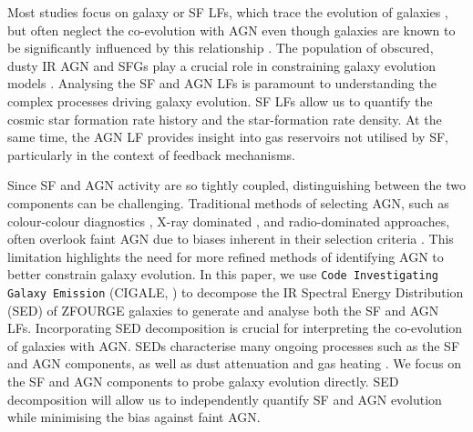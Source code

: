 Most studies focus on galaxy or SF LFs, which trace the evolution of galaxies \citep{tempel_tracing_2011, cool_galaxy_2012}, but often neglect the co-evolution with AGN \citep{fotopoulou_5-10_2016, symeonidis_agn_2021, finkelstein_coevolution_2022} even though galaxies are known to be significantly influenced by this relationship \citep{hopkins_cosmological_2008, fiore_agn_2017}. The population of obscured, dusty IR AGN and SFGs play a crucial role in constraining galaxy evolution models \citep{gruppioni_modelling_2011}. Analysing the SF and AGN LFs is paramount to understanding the complex processes driving galaxy evolution. SF LFs allow us to quantify the cosmic star formation rate history and the star-formation rate density. At the same time, the AGN LF provides insight into gas reservoirs not utilised by SF, particularly in the context of feedback mechanisms.

Since SF and AGN activity are so tightly coupled, distinguishing between the two components can be challenging. Traditional methods of selecting AGN, such as colour-colour diagnostics \citep{lacy_obscured_2004}, X-ray dominated \citep{szokoly_chandra_2004}, and radio-dominated \citep{rees_radio_2016} approaches, often overlook faint AGN due to biases inherent in their selection criteria \citep{thorne_deep_2022}. This limitation highlights the need for more refined methods of identifying AGN to better constrain galaxy evolution. In this paper, we use \texttt{Code Investigating Galaxy Emission} (CIGALE, \citealp{burgarella_star_2005, noll_analysis_2009, boquien_cigale_2019}) to decompose the IR Spectral Energy Distribution (SED) of ZFOURGE galaxies \citep{straatman_fourstar_2016} to generate and analyse both the SF and AGN LFs. Incorporating SED decomposition is crucial for interpreting the co-evolution of galaxies with AGN. SEDs characterise many ongoing processes such as the SF and AGN components, as well as dust attenuation and gas heating \citep{ho_spectral_1999, huang_local_2007, silva_modelling_2011, gruppioni_modelling_2011}. We focus on the SF and AGN components to probe galaxy evolution directly. SED decomposition will allow us to independently quantify SF and AGN evolution while minimising the bias against faint AGN.

